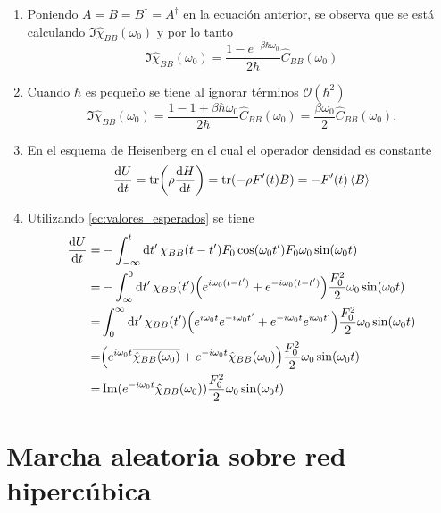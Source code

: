 \documentclass{article}
\begin{document}
\begin{enumerate}
\item Poniendo $A=B=B^\dagger=A^\dagger$ en la ecuación anterior, se observa que se está calculando $\Im\hat{\chi}_{BB}(\omega_0)$ y por lo tanto
\begin{equation}
\Im\hat{\chi}_{BB}(\omega_0)=\frac{1-e^{-\beta\hbar\omega_0}}{2\hbar}\hat{C}_{BB}(\omega_0)
\end{equation}

\item Cuando $\hbar$ es pequeño se tiene al ignorar términos $\mathcal{O}(\hbar^2)$
\begin{equation}
\Im\hat{\chi}_{BB}(\omega_0)=\frac{1-1+\beta\hbar\omega_0}{2\hbar}\hat{C}_{BB}(\omega_0)=\frac{\beta\omega_0}{2}\hat{C}_{BB}(\omega_0).
\end{equation}

\item En el esquema de Heisenberg en el cual el operador densidad es constante
\begin{equation}
\dv{U}{t}=\tr(\rho\dv{H}{t})=\tr(-\rho F'(t)B)=-F'(t)\ev{B}
\end{equation}

\item Utilizando \eqref{ec:valores_esperados} se tiene
\begin{align}
\begin{split}
\dv{U}{t}=&-\int_{-\infty}^t\dd{t'}\chi_{BB}(t-t')F_0\cos(\omega_0t')F_0\omega_0\sin(\omega_0t)\\
=&-\int_{\infty}^0\dd{t'}\chi_{BB}(t')\qty(e^{i\omega_0(t-t')}+e^{-i\omega_0(t-t')})\frac{F_0^2}{2}\omega_0\sin(\omega_0t)\\
=&\int_0^\infty\dd{t'}\chi_{BB}(t')\qty(e^{i\omega_0t}e^{-i\omega_0t'}+e^{-i\omega_0t}e^{i\omega_0t'})\frac{F_0^2}{2}\omega_0\sin(\omega_0t)\\
=&\qty(e^{i\omega_0t}\overline{\hat{\chi}_{BB}(\omega_0)}+e^{-i\omega_0t}\hat{\chi}_{BB}(\omega_0))\frac{F_0^2}{2}\omega_0\sin(\omega_0t)\\
=&\Im(e^{-i\omega_0t}\hat{\chi}_{BB}(\omega_0))\frac{F_0^2}{2}\omega_0\sin(\omega_0t)
\end{split}
\end{align}

\end{enumerate}

\section{Marcha aleatoria sobre red hipercúbica}
\end{document}

